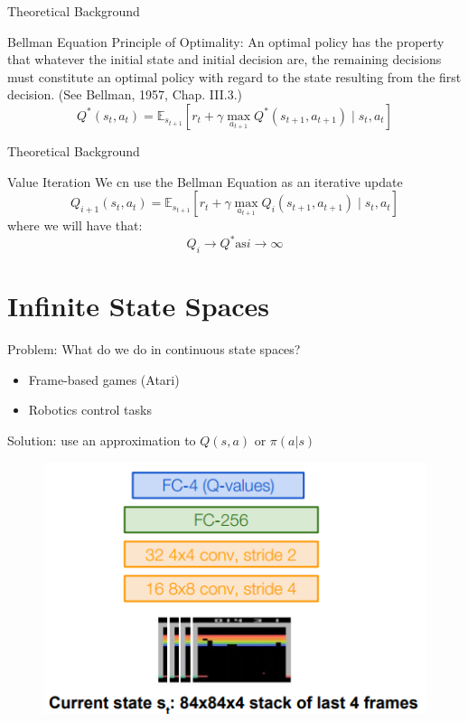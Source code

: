 \documentclass{beamer}
\begin{document}
	\begin{frame}{Theoretical Background}
		\begin{block}{Bellman Equation}
			Principle of Optimality: An optimal policy has the property that whatever the initial state and initial decision are, the remaining decisions must constitute an optimal policy with regard to the state resulting from the first decision. (See Bellman, 1957, Chap. III.3.)
			$$ Q^*(s_t,a_t) = \mathbb{E}_{s_{t+1}} \left[ r_t + \gamma \max_{a_{t+1}} Q^*(s_{t+1},a_{t+1})  \mid s_t,a_t \right] $$
		\end{block}
	\end{frame}
	
	\begin{frame}{Theoretical Background}
		\begin{block}{Value Iteration}
			We cn use the Bellman Equation as an iterative update
			$$ Q_{i+1}(s_t,a_t) = \mathbb{E}_{s_{t+1}} \left[ r_t + \gamma \max_{a_{t+1}} Q_{i}(s_{t+1},a_{t+1})  \mid s_t,a_t \right] $$
			where we will have that:
			$$ Q_i \to Q^* \text{as} i \to \infty $$
		\end{block}
	\end{frame}
	
	\section*{Infinite State Spaces}
	
	\begin{frame}{Problem: What do we do in continuous state spaces?}
		\begin{itemize}
			\item Frame-based games (Atari)
			\item Robotics control tasks
		\end{itemize}
	\end{frame}
	
	\begin{frame}{Solution: use an approximation to $Q(s, a)$ or $\pi(a | s)$}
		\begin{figure}
			\centering
			\includegraphics[height=0.7\textheight]{dqn_architecture.png}
		\end{figure}
	\end{frame}
	
\end{document}
